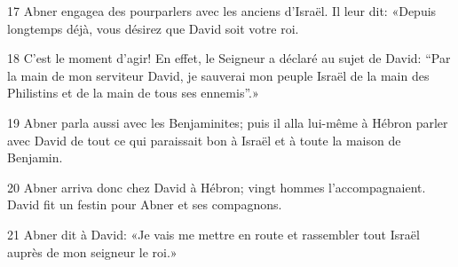 
17 Abner engagea des pourparlers avec les anciens d’Israël. Il leur dit: «Depuis longtemps déjà, vous désirez que David soit votre roi.

18 C’est le moment d’agir! En effet, le Seigneur a déclaré au sujet de David: “Par la main de mon serviteur David, je sauverai mon peuple Israël de la main des Philistins et de la main de tous ses ennemis”.»

19 Abner parla aussi avec les Benjaminites; puis il alla lui-même à Hébron parler avec David de tout ce qui paraissait bon à Israël et à toute la maison de Benjamin.

20 Abner arriva donc chez David à Hébron; vingt hommes l’accompagnaient. David fit un festin pour Abner et ses compagnons.

21 Abner dit à David: «Je vais me mettre en route et rassembler tout Israël auprès de mon seigneur le roi.» 